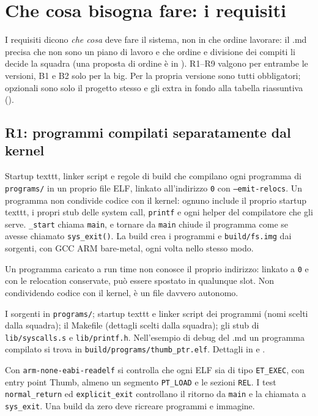 \section{Che cosa bisogna fare: i requisiti}
I requisiti dicono \emph{che cosa} deve fare il sistema, non in che ordine lavorare: il .md precisa che non sono un piano di lavoro e che ordine e divisione dei compiti li decide la squadra (una proposta di ordine è in ). R1--R9 valgono per entrambe le versioni, B1 e B2 solo per la big. Per la propria versione sono tutti obbligatori; opzionali sono solo il progetto stesso e gli extra in fondo alla tabella riassuntiva ().

\subsection{R1: programmi compilati separatamente dal kernel}
\begin{description}\sloppy
    \item[Che cosa chiede] Startup texttt, linker script e regole di build che compilano ogni programma di \texttt{programs/} in un proprio file ELF, linkato all'indirizzo \texttt{0} con \texttt{--emit-relocs}. Un programma non condivide codice con il kernel: ognuno include il proprio startup texttt, i propri stub delle system call, \texttt{printf} e ogni helper del compilatore che gli serve. \texttt{\_start} chiama \texttt{main}, e tornare da \texttt{main} chiude il programma come se avesse chiamato \texttt{sys\_exit()}. La build crea i programmi e \texttt{build/fs.img} dai sorgenti, con GCC ARM bare-metal, ogni volta nello stesso modo.
    \item[Perché serve] Un programma caricato a run time non conosce il proprio indirizzo: linkato a \texttt{0} e con le relocation conservate, può essere spostato in qualunque slot. Non condividendo codice con il kernel, è un file davvero autonomo.
    \item[Dove si interviene] I sorgenti in \texttt{programs/}; startup texttt e linker script dei programmi (nomi scelti dalla squadra); il Makefile (dettagli scelti dalla squadra); gli stub di \texttt{lib/syscalls.s} e \texttt{lib/printf.h}. Nell'esempio di debug del .md un programma compilato si trova in \texttt{build/programs/thumb\_ptr.elf}. Dettagli in  e .
    \item[Come si verifica] Con \texttt{arm-none-eabi-readelf} si controlla che ogni ELF sia di tipo \texttt{ET\_EXEC}, con entry point Thumb, almeno un segmento \texttt{PT\_LOAD} e le sezioni \texttt{REL}. I test \texttt{normal\_return} ed \texttt{explicit\_exit} controllano il ritorno da \texttt{main} e la chiamata a \texttt{sys\_exit}. Una build da zero deve ricreare programmi e immagine.
\end{description}

